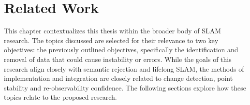 \section{Related Work}
\label{sec:related_work}

This chapter contextualizes this thesis within the broader body of SLAM research. The topics discussed are selected for their relevance to two key objectives: the previously outlined objectives, specifically the identification and removal of data that could cause instability or errors. While the goals of this research align closely with semantic rejection and lifelong SLAM, the methods of implementation and integration are closely related to change detection, point stability and re-observability confidence. The following sections explore how these topics relate to the proposed research.

% 